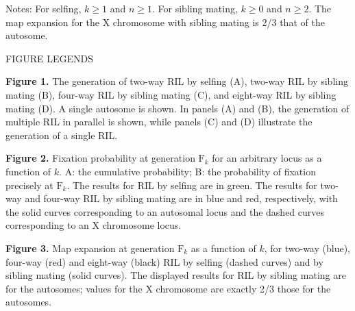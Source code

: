 \documentclass[12pt,letterpaper]{article}
\newenvironment{hanging}
{\begin{list}{}
        {\setlength{\labelwidth}{0in}
         \setlength{\leftmargin}{1em}
         \setlength{\itemindent}{-1em}
        }
}
{\end{list}}
\begin{document}
\noindent Notes: For selfing, $k \ge 1$ and $n \ge 1$.
For sibling mating, $k \ge 0$ and $n \ge 2$.
The map expansion for the X chromosome with sibling mating is 2/3 that of the autosome.

\newpage


\centerline{FIGURE LEGENDS}

\begin{hanging}

\item \textbf{Figure 1.} 
  The generation of two-way RIL by selfing (A),
  two-way RIL by sibling mating (B), four-way RIL by sibling mating
  (C), and eight-way RIL by sibling mating (D).  A single autosome is
  shown.  In panels (A) and (B), the generation of multiple RIL in
  parallel is shown, while panels (C) and (D) illustrate the
  generation of a single RIL.

\item \textbf{Figure 2.}
  Fixation probability at generation $\text{F}_k$ for an arbitrary locus 
  as a function of $k$.  A: the cumulative probability; B:
  the probability of fixation precisely at $\text{F}_k$.
  The results for RIL by selfing are in green.  The results for
  two-way and four-way RIL by sibling mating are in blue and red,
  respectively, with the solid curves corresponding to an autosomal
  locus and the dashed curves corresponding to an X chromosome locus. 

\item \textbf{Figure 3.}  
  Map expansion at generation $\text{F}_k$ as a function of $k$, for
  two-way (blue), four-way (red) and eight-way (black) RIL by
  selfing (dashed curves) and by sibling mating (solid curves).  The
  displayed results for RIL by sibling mating are for the autosomes;
  values for the X chromosome are exactly 2/3 those for the autosomes.

\end{hanging}

\newpage

\end{document}
